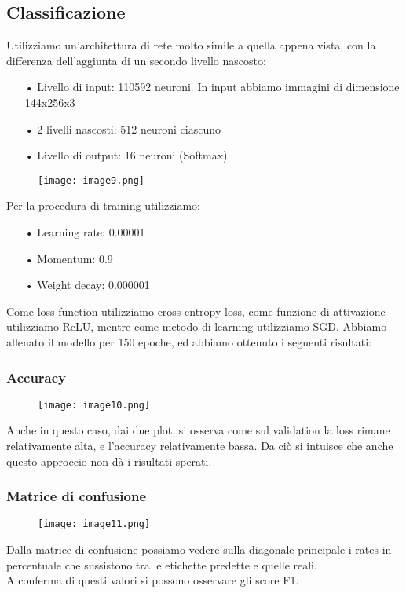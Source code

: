\subsection{Classificazione}
Utilizziamo un’architettura di rete molto simile a quella appena vista, con la differenza dell’aggiunta di un secondo livello nascosto:
\begin{itemize}
	\item[•]Livello di input: 110592 neuroni. In input abbiamo immagini di dimensione 144x256x3
	\item[•]2 livelli nascosti: 512 neuroni ciascuno
	\item[•]Livello di output: 16 neuroni (Softmax)
\end{itemize}
\begin{figure}[H]
	\centering
	\texttt{[image: image9.png]}
\end{figure}
Per la procedura di training utilizziamo: 
\begin{itemize}
	\item[•]Learning rate: 0.00001
	\item[•]Momentum: 0.9
	\item[•]Weight decay: 0.000001
\end{itemize}
Come loss function utilizziamo cross entropy loss, come funzione di attivazione utilizziamo ReLU, mentre come metodo di learning utilizziamo SGD.
\newline
Abbiamo allenato il modello per 150 epoche, ed abbiamo ottenuto i seguenti risultati:
\subsubsection{Accuracy}
\begin{figure}[H]
	\centering
	\texttt{[image: image10.png]}
\end{figure}
Anche in questo caso, dai due plot, si osserva come sul validation la loss rimane relativamente alta, e l’accuracy relativamente bassa. Da ciò si intuisce che anche questo approccio non dà i risultati sperati.

\subsubsection{Matrice di confusione}
\begin{figure}[H]
	\centering
	\texttt{[image: image11.png]}
\end{figure}
Dalla matrice di confusione possiamo vedere sulla diagonale principale i rates  in percentuale che sussistono tra le etichette predette e quelle reali. \\
A conferma di questi valori si possono osservare gli score F1.


